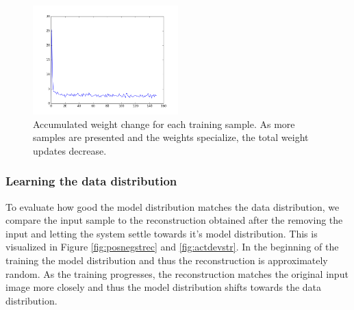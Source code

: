 \begin{figure}
	\centering
    	\includegraphics[width=0.5\textwidth]{imgs/inspect/wdiff.png} 
    \caption{Accumulated weight change for each training sample. As more samples are presented and the weights specialize, the total weight updates decrease.}
	\label{fig:ecdwdiff}
\end{figure}



\subsubsection{Learning the data distribution} \label{c:datadistexp}

To evaluate how good the model distribution matches the data distribution, we compare the input sample to the reconstruction obtained after the removing the input and letting the system settle towards it's model distribution.
This is visualized in Figure \ref{fig:posnegstrec} and \ref{fig:actdevstr}.
In the beginning of the training the model distribution and thus the reconstruction is approximately random.
As the training progresses, the reconstruction matches the original input image more closely and thus the model distribution shifts towards the data distribution.

